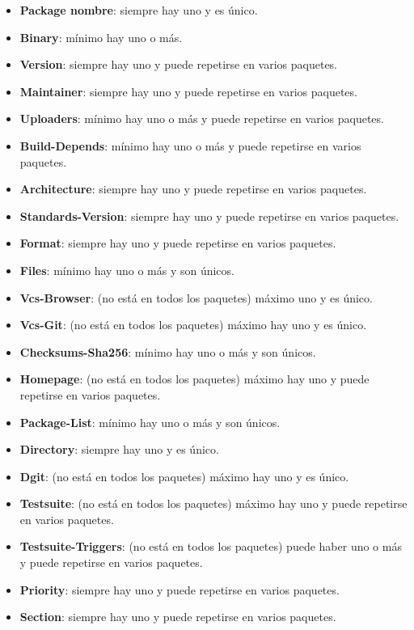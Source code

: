 \documentclass[a4paper, 12pt]{book}
\begin{document}
\begin{itemize}
	\item \textbf {Package nombre}: siempre hay uno y es único. 
	\item \textbf {Binary}: mínimo hay uno o más. 
	\item \textbf {Version}: siempre hay uno y puede repetirse en varios paquetes.
	\item \textbf {Maintainer}: siempre hay uno y puede repetirse en varios paquetes. 
	\item \textbf {Uploaders}: mínimo hay uno o más y puede repetirse en varios paquetes. 
	\item \textbf {Build-Depends}: mínimo hay uno o más y puede repetirse en varios paquetes.  
	\item \textbf {Architecture}: siempre hay uno y puede repetirse en varios paquetes. 
	\item \textbf {Standards-Version}: siempre hay uno y puede repetirse en varios paquetes.
	\item \textbf {Format}: siempre hay uno y puede repetirse en varios paquetes. 
	\item \textbf {Files}:  mínimo hay uno o más y son únicos. 
	\item \textbf {Vcs-Browser}: (no está en todos los paquetes) máximo uno y es único. 
	\item \textbf {Vcs-Git}: (no está en todos los paquetes) máximo hay uno y es único. 
	\item \textbf {Checksums-Sha256}: mínimo hay uno o más y son únicos. 
	\item \textbf {Homepage}: (no está en todos los paquetes) máximo hay uno y puede repetirse en varios paquetes. 
	\item \textbf {Package-List}: mínimo hay uno o más y son únicos. 
	\item \textbf {Directory}: siempre hay uno y es único. 
	\item \textbf {Dgit}: (no está en todos los paquetes) máximo hay uno y es único. 
	\item \textbf {Testsuite}: (no está en todos los paquetes) máximo hay uno y puede repetirse en varios paquetes. 
	\item \textbf {Testsuite-Triggers}: (no está en todos los paquetes) puede haber uno o más y puede repetirse en varios paquetes. 
	\item \textbf {Priority}: siempre hay uno y puede repetirse en varios paquetes. 
	\item \textbf {Section}: siempre hay uno y puede repetirse en varios paquetes. 
\end{itemize}
\end{document}
